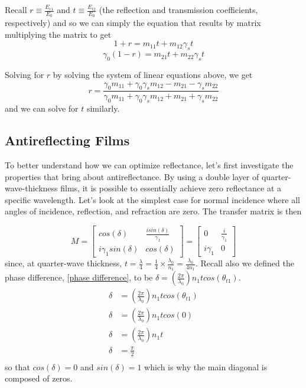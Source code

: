 Recall $r \equiv \frac{E_{r1}}{E_0}$ and $t \equiv \frac{E_{t2}}{E_0}$ (the reflection and transmission coefficients, respectively) and so we can simply the equation that results by matrix multiplying the matrix to get
\begin{equation}
1 + r = m_{11}t + m_{12}\gamma_st
\end{equation}
\begin{equation}
\gamma_0(1 - r) = m_{21}t + m_{22}\gamma_st
\end{equation}

Solving for $r$ by solving the system of linear equations above, we get
\begin{equation}\label{reflection coefficient in terms of transfer matrix terms}
r=\frac{\gamma_0m_{11} + \gamma_0\gamma_sm_{12} - m_{21} - \gamma_sm_{22}}{\gamma_0m_{11} + \gamma_0\gamma_sm_{12} + m_{21} + \gamma_sm_{22}}
\end{equation}
and we can solve for $t$ similarly.

\subsection{Antireflecting Films}
To better understand how we can optimize reflectance, let's first investigate the properties that bring about antireflectance. By using a double layer of quarter-wave-thickness films, it is possible to essentially achieve zero reflectance at a specific wavelength. Let's look at the simplest case for normal incidence where all angles of incidence, reflection, and refraction are zero. The transfer matrix is then

\[
M = 
    \begin{bmatrix}
    cos(\delta) & \frac{isin(\delta)}{\gamma_1}    \\
    i\gamma_1sin(\delta) & cos(\delta)
    \end{bmatrix} = 
    \begin{bmatrix}
    0 & \frac{i}{\gamma_1}  \\
    i\gamma_1 & 0
  \end{bmatrix}
\]
since, at quarter-wave thickness, $t=\frac{\lambda}{4} = \frac{1}{4} \times \frac{\lambda_0}{n_1} = \frac{\lambda_0}{4n_1}$. Recall also we defined the phase difference, \ref{phase difference}, to be $\delta = \left(\frac{2\pi}{\lambda_0}\right) n_1tcos(\theta_{t1})$.
\begin{align*}
    \delta &= \left(\frac{2\pi}{\lambda_0}\right) n_1tcos(\theta_{t1})\\
    \delta &= \left(\frac{2\pi}{\lambda_0}\right) n_1tcos(0) \\
    \delta &= \left(\frac{2\pi}{\lambda_0}\right) n_1t\\
    \delta &= \frac{\pi}{2} \\
\end{align*} so that $cos(\delta) = 0$ and $sin(\delta) = 1$ which is why the main diagonal is composed of zeros.

